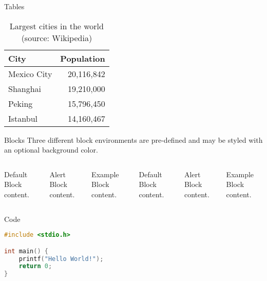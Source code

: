 \documentclass[10pt]{beamer}
\begin{document}
\begin{frame}{Tables}
  \begin{table}
    \caption{Largest cities in the world (source: Wikipedia)}
    \begin{tabular}{@{} lr @{}}
      \toprule
      City & Population\\
      \midrule
      Mexico City & 20,116,842\\
      Shanghai & 19,210,000\\
      Peking & 15,796,450\\
      Istanbul & 14,160,467\\
      \bottomrule
    \end{tabular}
  \end{table}
\end{frame}
\begin{frame}{Blocks}
  Three different block environments are pre-defined and may be styled with an
  optional background color.

  \begin{columns}[T,onlytextwidth]
      \begin{block}{Default}
        Block content.
      \end{block}

      \begin{alertblock}{Alert}
        Block content.
      \end{alertblock}

      \begin{exampleblock}{Example}
        Block content.
      \end{exampleblock}



      \begin{block}{Default}
        Block content.
      \end{block}

      \begin{alertblock}{Alert}
        Block content.
      \end{alertblock}

      \begin{exampleblock}{Example}
        Block content.
      \end{exampleblock}

  \end{columns}
\end{frame}
\begin{frame}[fragile]{Code}
  \begin{lstlisting}[language=C,basicstyle=\ttfamily]
#include <stdio.h>

int main() {
    printf("Hello World!");
    return 0;
}
  \end{lstlisting}
\end{frame}
\end{document}
